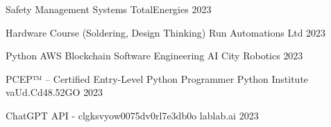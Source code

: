 \begin{cvhonors}
  \cvhonor
    {Safety Management Systems} %
    {TotalEnergies} %
    {} %
    {2023} %

  \cvhonor
    {Hardware Course (Soldering, Design Thinking)} %
    {Run Automations Ltd} %
    {} %
    {2023} %

  \cvhonor
    {Python AWS Blockchain Software Engineering} %
    {AI City Robotics} %
    {} %
    {2023} %

  \cvhonor
    {PCEP™ – Certified Entry-Level Python Programmer} %
    {Python Institute} %
    {vaUd.Cd48.52GO} %
    {2023} %

  \cvhonor
    {ChatGPT API - clgksvyow0075dv0rl7e3db0o} %
    {lablab.ai} %
    {} %
    {2023} %

\end{cvhonors}